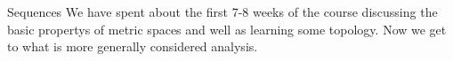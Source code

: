 \begin{chapter}{Sequences}
    We have spent about the first 7-8 weeks of the course discussing the basic propertys of metric spaces and well as learning some topology. Now we get to what is more generally considered analysis. 


\end{chapter}

